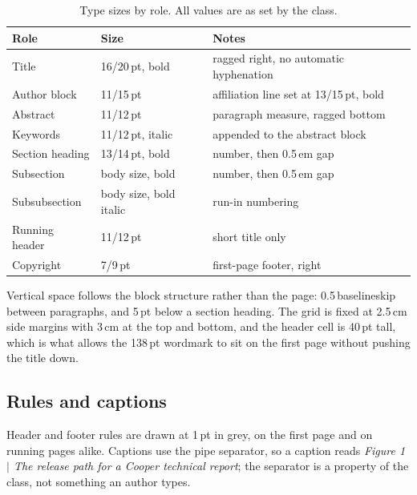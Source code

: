 \begin{table}[htbp]
  \centering
  \caption{Type sizes by role. All values are as set by the class.}
  \label{tab:sizes}
  \begin{tabular}{@{}lll@{}}
    \toprule
    Role & Size & Notes \\
    \midrule
    Title            & 16/20\,pt, bold    & ragged right, no automatic hyphenation \\
    Author block     & 11/15\,pt          & affiliation line set at 13/15\,pt, bold \\
    Abstract         & 11/12\,pt          & paragraph measure, ragged bottom \\
    Keywords         & 11/12\,pt, italic  & appended to the abstract block \\
    Section heading  & 13/14\,pt, bold    & number, then 0.5\,em gap \\
    Subsection       & body size, bold    & number, then 0.5\,em gap \\
    Subsubsection    & body size, bold italic & run-in numbering \\
    Running header   & 11/12\,pt          & short title only \\
    Copyright        & 7/9\,pt            & first-page footer, right \\
    \bottomrule
  \end{tabular}
\end{table}

Vertical space follows the block structure rather than the page: 0.5\,baselineskip between
paragraphs, and 5\,pt below a section heading. The grid is fixed at 2.5\,cm side margins with
3\,cm at the top and bottom, and the header cell is 40\,pt tall, which is what allows
the 138\,pt wordmark to sit on the first page without pushing the title down.

\subsection{Rules and captions}

Header and footer rules are drawn at 1\,pt in grey, on the first page and on running pages
alike. Captions use the pipe separator, so a caption reads \emph{Figure 1 $\vert$ The release
path for a Cooper technical report}; the separator is a property of the class, not something an author
types.
